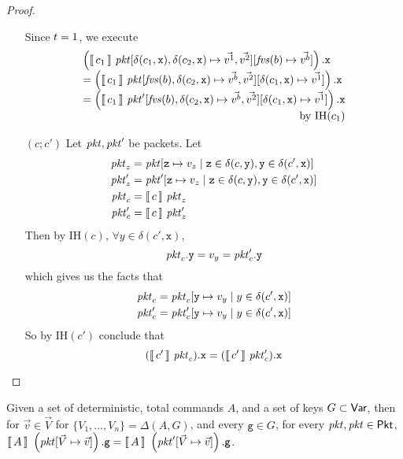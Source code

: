 \begin{proof}
\begin{enumerate}[align=left]
    Since $t = 1$, we execute
    \[\begin{array}l
        \left(\bracbb{c_1}~\pkt[\delta(c_1,\texttt{x}),\delta(c_2,\texttt{x})
        \mapsto \vec{v^1},\vec{v^2}][\fvs(b) \mapsto \vec{v^b}]\right).\texttt{x}
        \\ =  \left(\bracbb{c_1}~\pkt[\fvs(b),\delta(c_2,\texttt{x})
        \mapsto \vec{v^b}, \vec{v^2}][\delta(c_1,\texttt{x}) \mapsto \vec{v^1}]\right).\texttt{x}
        \\ = \left(\bracbb{c_1}~\pkt'[\fvs(b),\delta(c_2,\texttt{x})
        \mapsto \vec{v^b}, \vec{v^2}][\delta(c_1,\texttt{x}) \mapsto \vec{v^1}]\right).\texttt{x}
        \\ \multicolumn 1 r {\text{by IH}(c_1)}
      \end{array}
    \]
  \item[$(c;c')$] Let $\mathit{pkt}, \mathit{pkt}'$ be packets.
    Let
    \begin{align*}
      \mathit{pkt}_z &= \mathit{pkt}[\texttt{z} \mapsto v_z \mid \texttt z \in \delta(c, \texttt y), \texttt y \in \delta(c', \texttt{x})] \\
      \mathit{pkt}'_z &= \mathit{pkt}'[\texttt{z} \mapsto v_z\mid \texttt z \in \delta(c, \texttt y), \texttt y \in \delta(c', \texttt{x})]\\
      \mathit{pkt}_c &= \llbracket\,c\,\rrbracket~\mathit{pkt}_z \\
      \mathit{pkt}'_c &= \llbracket\,c\,\rrbracket~\mathit{pkt}'_z 
    \end{align*}
    Then by IH$(c)$, $\forall y \in \delta(c', \texttt{x})$,
    \[\mathit{pkt}_c.\texttt{y} = v_y = \mathit{pkt}'_c.\texttt{y}\]
    which gives us the facts that
    \begin{align*}
      \mathit{pkt}_c &= \mathit{pkt}_c[\texttt{y} \mapsto v_y \mid y \in \delta(c', \texttt{x})]\\
      \mathit{pkt}'_c &= \mathit{pkt}'_c[\texttt{y} \mapsto v_y \mid y \in \delta(c', \texttt{x})]
    \end{align*}
    So by IH$(c')$ conclude that 
    \[(\llbracket\,c'\,\rrbracket~\mathit{pkt}_c).\texttt{x} = (\llbracket\,c'\,\rrbracket~\mathit{pkt}'_c).\texttt{x}\]
  \end{enumerate}
\end{proof}  

\begin{proposition}
  \label{prop:Delta-dom}
  Given a set of deterministic, total commands $A$, and a set of keys
  $G \subset \mathsf{Var}$, then for $\vec{v} \in \vec{V}$ for
  $\{V_1, \ldots, V_n\} = \Delta(A,G)$, and every $\texttt{g} \in G$, for every
  $\mathit{pkt}, \mathit{pkt} \in \mathsf{Pkt}$,
  $\llbracket\,A\,\rrbracket~\left(\mathit{pkt}[\vec V \mapsto \vec v]\right).\texttt{g} =
  \llbracket\,A\,\rrbracket~\left(\mathit{pkt}'[\vec V \mapsto \vec v]\right).\texttt{g}$.
\end{proposition}

